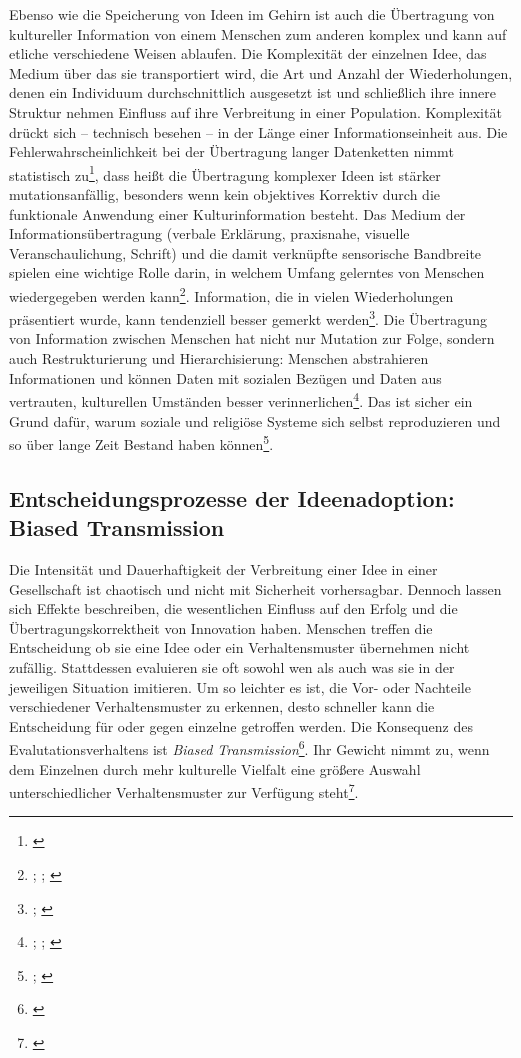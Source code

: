 \documentclass[openany,twoside,twocolumn]{book}
\let\rmarkdownfootnote\footnote%
\def\footnote{\protect\rmarkdownfootnote}
\begin{document}
Ebenso wie die Speicherung von Ideen im Gehirn ist auch die Übertragung
von kultureller Information von einem Menschen zum anderen komplex und
kann auf etliche verschiedene Weisen ablaufen. Die Komplexität der
einzelnen Idee, das Medium über das sie transportiert wird, die Art und
Anzahl der Wiederholungen, denen ein Individuum durchschnittlich
ausgesetzt ist und schließlich ihre innere Struktur nehmen Einfluss auf
ihre Verbreitung in einer Population. Komplexität drückt sich --
technisch besehen -- in der Länge einer Informationseinheit aus. Die
Fehlerwahrscheinlichkeit bei der Übertragung langer Datenketten nimmt
statistisch zu\footnote{\textcite{eerkens_cultural_2007}}, dass heißt
die Übertragung komplexer Ideen ist stärker mutationsanfällig, besonders
wenn kein objektives Korrektiv durch die funktionale Anwendung einer
Kulturinformation besteht. Das Medium der Informationsübertragung
(verbale Erklärung, praxisnahe, visuelle Veranschaulichung, Schrift) und
die damit verknüpfte sensorische Bandbreite spielen eine wichtige Rolle
darin, in welchem Umfang gelerntes von Menschen wiedergegeben werden
kann\footnote{\textcite{eerkens_cultural_2005};
  \textcite{eerkens_practice_2000}; \textcite{eerkens_techniques_2001}}.
Information, die in vielen Wiederholungen präsentiert wurde, kann
tendenziell besser gemerkt werden\footnote{\textcite{cover_elements_2012};
  \textcite{shannon_mathematical_1949}}. Die Übertragung von Information
zwischen Menschen hat nicht nur Mutation zur Folge, sondern auch
Restrukturierung und Hierarchisierung: Menschen abstrahieren
Informationen und können Daten mit sozialen Bezügen und Daten aus
vertrauten, kulturellen Umständen besser verinnerlichen\footnote{\textcite{mesoudi_hierarchical_2004};
  \textcite{mesoudi_bias_2006}; \textcite{washburn_remembering_2001}}.
Das ist sicher ein Grund dafür, warum soziale und religiöse Systeme sich
selbst reproduzieren und so über lange Zeit Bestand haben
können\footnote{\textcite{kuijt_people_2000};
  \textcite{kuijt_place_2001}}.

\hypertarget{biased-transmission}{%
\subsection{Entscheidungsprozesse der Ideenadoption: Biased
Transmission}\label{biased-transmission}}

Die Intensität und Dauerhaftigkeit der Verbreitung einer Idee in einer
Gesellschaft ist chaotisch und nicht mit Sicherheit vorhersagbar.
Dennoch lassen sich Effekte beschreiben, die wesentlichen Einfluss auf
den Erfolg und die Übertragungskorrektheit von Innovation haben.
Menschen treffen die Entscheidung ob sie eine Idee oder ein
Verhaltensmuster übernehmen nicht zufällig. Stattdessen evaluieren sie
oft sowohl wen als auch was sie in der jeweiligen Situation imitieren.
Um so leichter es ist, die Vor- oder Nachteile verschiedener
Verhaltensmuster zu erkennen, desto schneller kann die Entscheidung für
oder gegen einzelne getroffen werden. Die Konsequenz des
Evalutationsverhaltens ist \emph{Biased Transmission}\footnote{\textcite{henrich_cultural_2001}}.
Ihr Gewicht nimmt zu, wenn dem Einzelnen durch mehr kulturelle Vielfalt
eine größere Auswahl unterschiedlicher Verhaltensmuster zur Verfügung
steht\footnote{\textcite{smith_cultural_1992}}.
\end{document}
